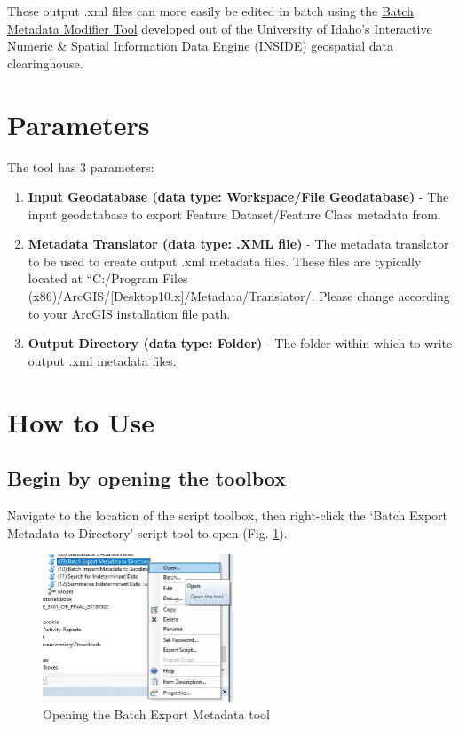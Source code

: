 \documentclass[openany]{book}
\providecommand{\tightlist}{%
  \setlength{\itemsep}{0pt}\setlength{\parskip}{0pt}}
\theoremstyle{definition}
\theoremstyle{definition}
\theoremstyle{definition}
\theoremstyle{remark}
\begin{document}
These output .xml files can more easily be edited in batch using the
\href{http://insideidaho.org/helpdocs/batch_metadata_modifier_tool.html}{Batch
Metadata Modifier Tool} developed out of the University of Idaho's
Interactive Numeric \& Spatial Information Data Engine (INSIDE)
geospatial data clearinghouse.

\section{Parameters}\label{parameters-11}

The tool has 3 parameters:

\begin{enumerate}
\def\labelenumi{\arabic{enumi}.}
\tightlist
\item
  \textbf{Input Geodatabase (data type: Workspace/File Geodatabase)} -
  The input geodatabase to export Feature Dataset/Feature Class metadata
  from.
\item
  \textbf{Metadata Translator (data type: .XML file)} - The metadata
  translator to be used to create output .xml metadata files. These
  files are typically located at ``C:/Program Files
  (x86)/ArcGIS/{[}Desktop10.x{]}/Metadata/Translator/. Please change
  according to your ArcGIS installation file path.
\item
  \textbf{Output Directory (data type: Folder)} - The folder within
  which to write output .xml metadata files.
\end{enumerate}

\section{How to Use}\label{how-to-use-11}

\subsection{Begin by opening the
toolbox}\label{begin-by-opening-the-toolbox-11}

Navigate to the location of the script toolbox, then right-click the
`Batch Export Metadata to Directory' script tool to open (Fig.
\ref{fig:exMetaopen}).

\begin{figure}[H]

{\centering \includegraphics[width=2.23in,]{figures/exMeta-open} 

}

\caption{Opening the Batch Export Metadata tool}\label{fig:exMetaopen}
\end{figure}
\end{document}
